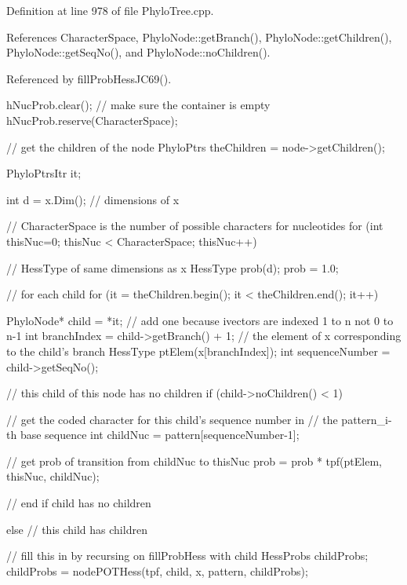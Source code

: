 \-Definition at line 978 of file \-Phylo\-Tree.\-cpp.



\-References \-Character\-Space, \-Phylo\-Node\-::get\-Branch(), \-Phylo\-Node\-::get\-Children(), \-Phylo\-Node\-::get\-Seq\-No(), and \-Phylo\-Node\-::no\-Children().



\-Referenced by fill\-Prob\-Hess\-J\-C69().


\begin{DoxyCode}
{
  hNucProb.clear(); // make sure the container is empty
  hNucProb.reserve(CharacterSpace);

                    // get the children of the node
  PhyloPtrs theChildren = node->getChildren();

  PhyloPtrsItr it;

  int d = x.Dim();  // dimensions of x

  // CharacterSpace is the number of possible characters for nucleotides
  for (int thisNuc=0; thisNuc < CharacterSpace; thisNuc++)
  {
                    // HessType of same dimensions as x
    HessType prob(d);
    prob = 1.0;

    // for each child
    for (it = theChildren.begin(); it < theChildren.end(); it++)
    {

      PhyloNode* child = *it;
                    // add one because ivectors are indexed 1 to n not 0 to n-1
      int branchIndex = child->getBranch() + 1;
                    // the element of x corresponding to the child's branch
      HessType ptElem(x[branchIndex]);
      int sequenceNumber = child->getSeqNo();

                    // this child of this node has no children
      if (child->noChildren() < 1)
      {

        // get the coded character for this child's sequence number in 
        // the pattern_i-th base sequence
        int childNuc = pattern[sequenceNumber-1];

        // get prob of transition from childNuc to thisNuc
        prob = prob * tpf(ptElem, thisNuc, childNuc);

      }             // end if child has no children

      else          // this child has children
      {

                    // fill this in by recursing on fillProbHess with child
        HessProbs childProbs;
        childProbs = nodePOTHess(tpf, child, x, pattern, childProbs);

}}}}
\end{DoxyCode}
